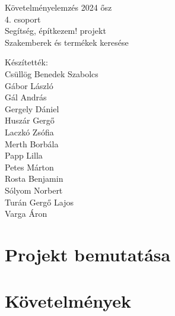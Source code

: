 \documentclass{report}
\begin{document}
\begin{titlepage}
   \centering
   \vspace{.7\baselineskip}
   { \huge
        Követelményelemzés 2024 ősz \\ 4. csoport \\[1em]
        Segítség, építkezem! projekt \\[2em]
        Szakemberek és termékek keresése \\ [5em]
   }

   Készítették: \\
    Csüllög Benedek Szabolcs \\
    Gábor László \\
    Gál András \\
    Gergely Dániel \\
    Huszár Gergő \\
    Laczkó Zsófia \\
    Merth Borbála \\
    Papp Lilla \\
    Petes Márton \\
    Rosta Benjamin \\
    Sólyom Norbert \\
    Turán Gergő Lajos \\
    Varga Áron \\

\end{titlepage}

\tableofcontents

\chapter{Projekt bemutatása}


\chapter{Követelmények}



\clearpage



\clearpage





\clearpage



\clearpage


\end{document}
